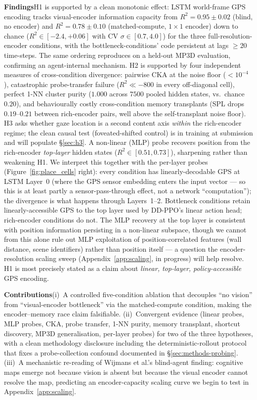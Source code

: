 \documentclass{article}
\begin{document}
\noindent\textbf{Findings}\quad H1 is supported by a clean monotonic effect: LSTM world-frame GPS encoding tracks visual-encoder information capacity from $R^2 = 0.95\pm 0.02$ (blind, no encoder) and $R^2 = 0.78\pm 0.10$ (matched-compute, $1{\times}1$ encoder) down to chance ($R^2 \in [-2.4, +0.06]$ with CV $\sigma \in [0.7, 4.0]$) for the three full-resolution-encoder conditions, with the bottleneck-conditions' code persistent at lags $\geq 20$ time-steps. The same ordering reproduces on a held-out MP3D evaluation, confirming an agent-internal mechanism. H2 is supported by four independent measures of cross-condition divergence: pairwise CKA at the noise floor ($<10^{-4}$), catastrophic probe-transfer failure ($R^2 \ll -800$ in every off-diagonal cell), perfect 1-NN cluster purity ($1.000$ across $7500$ pooled hidden states, vs.\ chance $0.20$), and behaviourally costly cross-condition memory transplants (SPL drops $0.19$--$0.21$ between rich-encoder pairs, well above the self-transplant noise floor). H3 asks whether gaze location is a second content axis \emph{within} the rich-encoder regime; the clean causal test (foveated-shifted control) is in training at submission and will populate §\ref{sec:h3}. A non-linear (MLP) probe recovers position from the rich-encoder \emph{top-layer} hidden states ($R^2 \in [0.51, 0.73]$), sharpening rather than weakening H1. We interpret this together with the per-layer probes (Figure~\ref{fig:place_cells} right): every condition has linearly-decodable GPS at LSTM Layer~0 (where the GPS sensor embedding enters the input vector --- so this is at least partly a sensor-pass-through effect, not a network ``computation''); the divergence is what happens through Layers~1--2. Bottleneck conditions retain linearly-accessible GPS to the top layer used by DD-PPO's linear action head; rich-encoder conditions do not. The MLP recovery at the top layer is consistent with position information persisting in a non-linear subspace, though we cannot from this alone rule out MLP exploitation of position-correlated features (wall distance, scene identifiers) rather than position itself --- a question the encoder-resolution scaling sweep (Appendix~\ref{app:scaling}, in progress) will help resolve. H1 is most precisely stated as a claim about \emph{linear, top-layer, policy-accessible} GPS encoding.

\noindent\textbf{Contributions}\quad (i)~A controlled five-condition ablation that decouples ``no vision'' from ``visual-encoder bottleneck'' via the matched-compute condition, making the encoder--memory race claim falsifiable. (ii)~Convergent evidence (linear probes, MLP probes, CKA, probe transfer, 1-NN purity, memory transplant, shortcut discovery, MP3D generalisation, per-layer probes) for two of the three hypotheses, with a clean methodology disclosure including the deterministic-rollout protocol that fixes a probe-collection confound documented in §\ref{sec:methods-probing}. (iii)~A mechanistic re-reading of Wijmans et al.'s blind-agent finding: cognitive maps emerge not because vision is absent but because the visual encoder cannot resolve the map, predicting an encoder-capacity scaling curve we begin to test in Appendix~\ref{app:scaling}.
\end{document}
